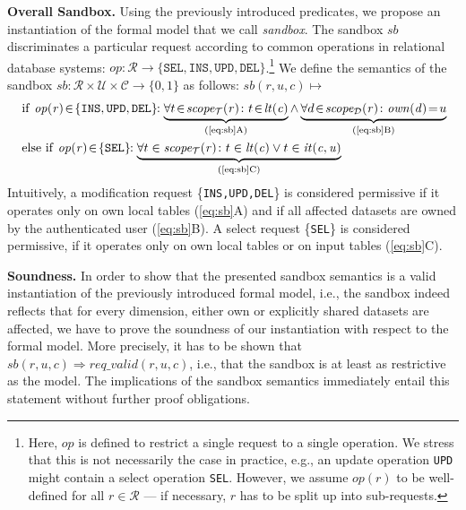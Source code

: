 \documentclass{src/acm_proc_article-sp} \else
\newcommand\myparagraph[1]{\medskip\noindent\textbf{#1.}}
\newcommand\cC{\ensuremath{\mathcal{C}}\xspace}
\newcommand\cD{\ensuremath{\mathcal{D}}\xspace}
\newcommand\cT{\ensuremath{\mathcal{T}}\xspace}
\newcommand\cR{\ensuremath{\mathcal{R}}\xspace}
\newcommand\cU{\ensuremath{\mathcal{U}}\xspace}
\begin{document}
\myparagraph{Overall Sandbox}
Using the previously introduced predicates, we propose an
instantiation of the formal model that we call \emph{sandbox}. The
sandbox $\mathit{sb}$ discriminates a particular request according to
common operations in relational database systems:
$
 \mathit{op} \colon \cR \rightarrow \{\mathtt{SEL}, \mathtt{INS}, \mathtt{UPD}, \mathtt{DEL}\}
$.\footnote{Here, $\mathit{op}$ is defined to restrict a single request to a
single operation. We stress that this is not necessarily the case in
practice, e.g., an update operation \texttt{UPD} might contain a
select operation \texttt{SEL}.
However, we assume
$\mathit{op(r)}$ to be well-defined for all $r \in \cR$ --- if
necessary, $r$ has to be split up into sub-requests.}
We define the semantics of the sandbox
$\mathit{sb} \colon \cR \times \cU \times \cC \rightarrow \{0, 1\}$
as follows: $\mathit{sb(r, u, c)} \mapsto$
\begin{equation}\label{eq:sb}
    \begin{aligned}
    & \;\mathrm{if~}\mathit{op(r)}\!\in\!\{\mathtt{INS}, \mathtt{UPD}, \mathtt{DEL}\}\!\!:
    \underbrace{\forall t\!\in\!\mathit{scope_{\cT}(r)} \colon t\!\in\!\mathit{lt(c)}}_{\text{(\ref{eq:sb}A)}} \wedge
      \underbrace{\forall d\!\in\!\mathit{scope_{\cD}(r)} \colon \mathit{own(d)} \!=\! u}_{\text{(\ref{eq:sb}B)}} \\
    & \;\mathrm{else~if~}\mathit{op(r)} \!\in\! \{\mathtt{SEL}\}\!\!:
    \underbrace{\forall t \in \mathit{scope_{\cT}(r)} \colon t \in \mathit{lt(c)} \vee t \in \mathit{it(c, u)}}_{\text{(\ref{eq:sb}C)}}
    \end{aligned}
\end{equation}
Intuitively, a modification request \{\texttt{INS,UPD,DEL}\} is
considered permissive if it operates only on own local tables
(\ref{eq:sb}A) and if all affected datasets are owned by the
authenticated user (\ref{eq:sb}B). A select request \{\texttt{SEL}\}
is considered permissive, if it operates only on own local tables or
on input tables (\ref{eq:sb}C).


\myparagraph{Soundness}
In order to show that the presented sandbox semantics is a valid
instantiation of the previously introduced formal model, i.e., the
sandbox indeed reflects that for every dimension, either own or
explicitly shared datasets are affected, we have to prove the
soundness of our instantiation with respect to the formal model.
More precisely, it has to be shown that $\mathit{sb(r, u, c)}
\Rightarrow \mathit{req\_valid(r, u, c)}$, i.e., that the sandbox
is at least as restrictive as the model. The implications of the
sandbox semantics immediately entail this statement without further
proof obligations.
\end{document}
